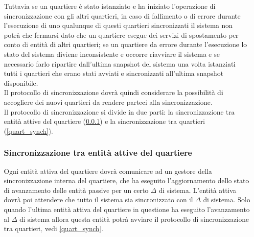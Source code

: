 Tuttavia se un quartiere è stato istanziato e ha iniziato l'operazione di sincronizzazione con gli altri quartieri, in caso di fallimento o di errore durante l'esecuzione di uno qualunque di questi quartieri sincronizzati il sistema non potrà che fermarsi dato che un quartiere esegue dei servizi di spostamento per conto di entità di altri quartieri; se un quartiere da errore durante l'esecuzione lo stato del sistema diviene inconsistente e occorre riavviare il sistema e se necessario farlo ripartire dall'ultima snapshot del sistema una volta istanziati tutti i quartieri che erano stati avviati e sincronizzati all'ultima snapshot disponibile.\\
Il protocollo di sincronizzazione dovrà quindi considerare la possibilità di accogliere dei nuovi quartieri da rendere parteci alla sincronizzazione.\\
Il protocollo di sincronizzazione si divide in due parti: la sincronizzazione tra entità attive del quartiere (\ref{int_synch}) e la sincronizzazione tra quartieri (\ref{quart_synch}).
\subsubsection{Sincronizzazione tra entità attive del quartiere}
\label{int_synch}
Ogni entità attiva del quartiere dovrà comunicare ad un gestore della sincronizzazione interna del quartiere, che ha eseguito l'aggiornamento dello stato di avanzamento delle entità passive per un certo $\Delta$ di sistema. L'entità attiva dovrà poi attendere che tutto il sistema sia sincronizzato con il $\Delta$ di sistema. Solo quando l'ultima entità attiva del quartiere in questione ha eseguito l'avanzamento al $\Delta$ di sistema allora questa entità potrà avviare il protocollo di sincronizzazione tra quartieri, vedi \ref{quart_synch}.

